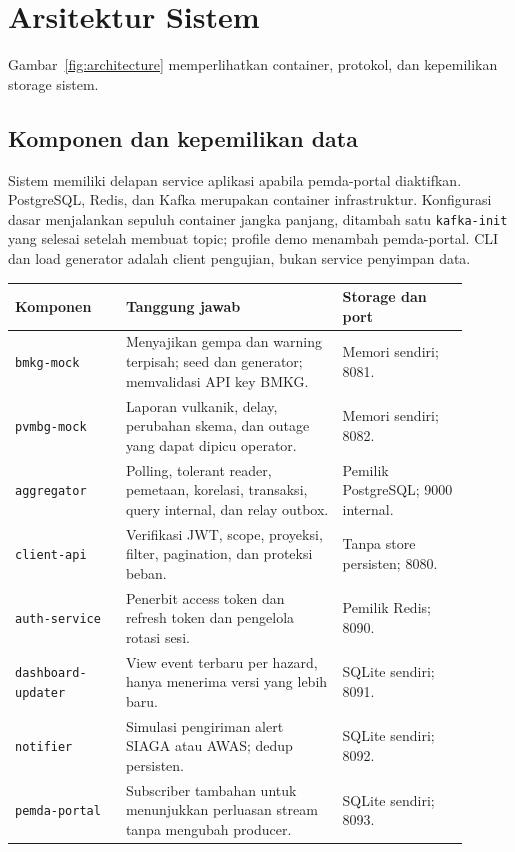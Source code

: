 \section{Arsitektur Sistem}
\label{sec:architecture}
Gambar~\ref{fig:architecture} memperlihatkan container, protokol, dan kepemilikan storage sistem.
\architecturefigure

\subsection{Komponen dan kepemilikan data}
Sistem memiliki delapan service aplikasi apabila pemda-portal diaktifkan. PostgreSQL, Redis, dan Kafka merupakan container infrastruktur. Konfigurasi dasar menjalankan sepuluh container jangka panjang, ditambah satu \texttt{kafka-init} yang selesai setelah membuat topic; profile demo menambah pemda-portal. CLI dan load generator adalah client pengujian, bukan service penyimpan data.

\begin{longtable}{P{0.22\linewidth}P{0.43\linewidth}P{0.25\linewidth}}
\toprule Komponen & Tanggung jawab & Storage dan port\\\midrule\endhead
\texttt{bmkg-mock} & Menyajikan gempa dan warning terpisah; seed dan generator; memvalidasi API key BMKG. & Memori sendiri; 8081.\\
\texttt{pvmbg-mock} & Laporan vulkanik, delay, perubahan skema, dan outage yang dapat dipicu operator. & Memori sendiri; 8082.\\
\texttt{aggregator} & Polling, tolerant reader, pemetaan, korelasi, transaksi, query internal, dan relay outbox. & Pemilik PostgreSQL; 9000 internal.\\
\texttt{client-api} & Verifikasi JWT, scope, proyeksi, filter, pagination, dan proteksi beban. & Tanpa store persisten; 8080.\\
\texttt{auth-service} & Penerbit access token dan refresh token dan pengelola rotasi sesi. & Pemilik Redis; 8090.\\
\texttt{dashboard-updater} & View event terbaru per hazard, hanya menerima versi yang lebih baru. & SQLite sendiri; 8091.\\
\texttt{notifier} & Simulasi pengiriman alert SIAGA atau AWAS; dedup persisten. & SQLite sendiri; 8092.\\
\texttt{pemda-portal} & Subscriber tambahan untuk menunjukkan perluasan stream tanpa mengubah producer. & SQLite sendiri; 8093.\\
\bottomrule
\end{longtable}

